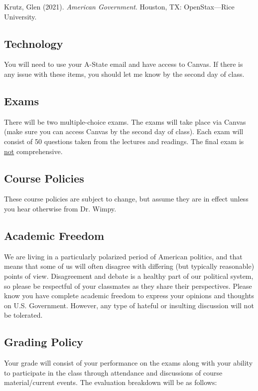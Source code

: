 \documentclass[11pt]{article}
\begin{document}
\vspace{1cm}

Krutz, Glen (2021).
\emph{American Government}.
Houston, TX: OpenStax---Rice University.

\subsection*{\textcolor{customred}{\bfseries Technology}}
You will need to use your A-State email and have access to Canvas. If there is any issue with these items, you should let me know by the second day of class.

\subsection*{\textcolor{customred}{\bfseries Exams}}
There will be two multiple-choice exams. The exams will take place via Canvas (make sure you can access Canvas by the second day of class). Each exam will consist of 50 questions taken from the lectures and readings. The final exam is \underline{not} comprehensive.

\subsection*{\textcolor{customred}{\bfseries Course Policies}}
These course policies are subject to change, but assume they are in effect unless you hear otherwise from Dr. Wimpy.

\subsection*{\textcolor{customred}{\bfseries Academic Freedom}}
We are living in a particularly polarized period of American politics, and that means that some of us will often disagree with differing (but typically reasonable) points of view. Disagreement and debate is a healthy part of our political system, so please be respectful of your classmates as they share their perspectives. Please know you have complete academic freedom to express your opinions and thoughts on U.S. Government. However, any type of hateful or insulting discussion will not be tolerated.

\subsection*{\textcolor{customred}{\bfseries Grading Policy}}
Your grade will consist of your performance on the exams along with your ability to participate in the class through attendance and discussions of course material/current events. The evaluation breakdown will be as follows:
\end{document}
